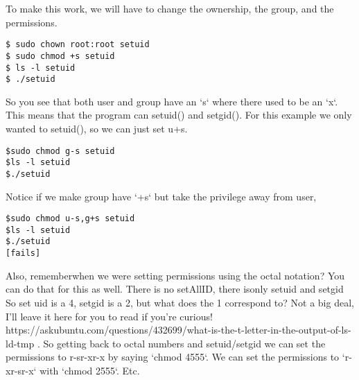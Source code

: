 \documentclass[12pt]{article}
\begin{document}
To make this work, we will have to change the ownership, the group, and the permissions.

\begin{lstlisting}
$ sudo chown root:root setuid
$ sudo chmod +s setuid
$ ls -l setuid
$ ./setuid
\end{lstlisting}

So you see that both user and group have an `s` where there used to be an `x`. This means that the program can setuid() and setgid(). For this example we only wanted to setuid(), so we can just set u+s.

\begin{lstlisting}
$sudo chmod g-s setuid
$ls -l setuid
$./setuid
\end{lstlisting}

Notice if we make group have `+s` but take the privilege away from user, 

\begin{lstlisting}
$sudo chmod u-s,g+s setuid
$ls -l setuid
$./setuid
[fails]
\end{lstlisting}

Also, rememberwhen we were setting permissions using the octal notation? You can do that for this as well. There is no setAllID, there isonly setuid and setgid
So set uid is a 4, setgid is a 2, but what does the 1 correspond to? Not a big deal, I'll leave it here for you to read if you're curious! https://askubuntu.com/questions/432699/what-is-the-t-letter-in-the-output-of-ls-ld-tmp . So getting back to octal numbers and setuid/setgid we can set the permissions to r-sr-xr-x by saying `chmod 4555`. We can set the permissions to `r-xr-sr-x` with `chmod 2555`. Etc.
\end{document}
